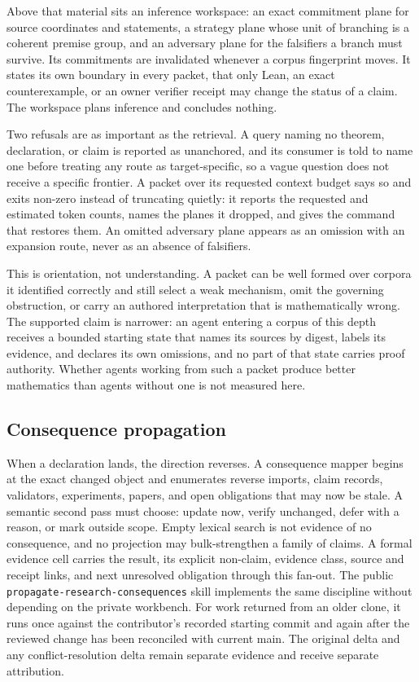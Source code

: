 \documentclass[10pt]{article}
\begin{document}
Above that material sits an inference workspace: an exact commitment plane for
source coordinates and statements, a strategy plane whose unit of branching is
a coherent premise group, and an adversary plane for the falsifiers a branch
must survive. Its commitments are invalidated whenever a corpus fingerprint
moves. It states its own boundary in every packet, that only Lean, an exact
counterexample, or an owner verifier receipt may change the status of a claim.
The workspace plans inference and concludes nothing.

Two refusals are as important as the retrieval. A query naming no theorem,
declaration, or claim is reported as unanchored, and its consumer is told to
name one before treating any route as target-specific, so a vague question does
not receive a specific frontier. A packet over its requested context budget
says so and exits non-zero instead of truncating quietly: it reports the
requested and estimated token counts, names the planes it dropped, and gives
the command that restores them. An omitted adversary plane appears as an
omission with an expansion route, never as an absence of falsifiers.

This is orientation, not understanding. A packet can be well formed over
corpora it identified correctly and still select a weak mechanism, omit the
governing obstruction, or carry an authored interpretation that is
mathematically wrong. The supported claim is narrower: an agent entering a
corpus of this depth receives a bounded starting state that names its sources
by digest, labels its evidence, and declares its own omissions, and no part of
that state carries proof authority. Whether agents working from such a packet
produce better mathematics than agents without one is not measured here.

\subsection{Consequence propagation}

When a declaration lands, the direction reverses. A consequence mapper begins
at the exact changed object and enumerates reverse imports, claim records,
validators, experiments, papers, and open obligations that may now be stale.
A semantic second pass must choose: update now, verify unchanged, defer with a
reason, or mark outside scope. Empty lexical search is not evidence of no
consequence, and no projection may bulk-strengthen a family of claims. A formal
evidence cell carries the result, its explicit non-claim, evidence class,
source and receipt links, and next unresolved obligation through this fan-out.
The public \texttt{propagate-research-consequences} skill implements the same
discipline without depending on the private workbench. For work returned from
an older clone, it runs once against the contributor's recorded starting
commit and again after the reviewed change has been reconciled with current
main. The original delta and any conflict-resolution delta remain separate
evidence and receive separate attribution.
\end{document}
